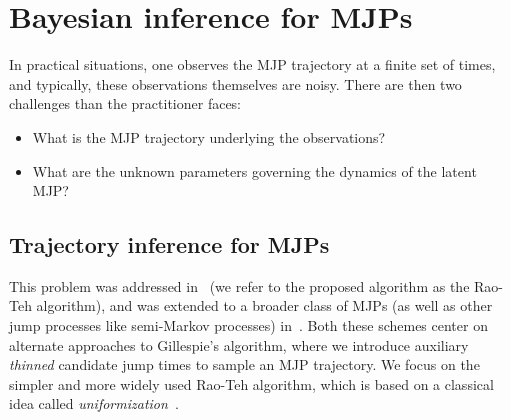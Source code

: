 
\section{Bayesian inference for MJPs}
In practical situations, one observes the MJP trajectory at
a finite set of times, and typically, these observations themselves
are noisy. There are then two challenges than the practitioner faces:
\begin{itemize}
  \item What is the MJP trajectory underlying the observations?
  \item What are the unknown parameters governing the dynamics of the 
    latent MJP?
\end{itemize}

\subsection{Trajectory inference for MJPs}
This problem was addressed in~\cite{RaoTeh13} (we refer to the proposed
algorithm as the Rao-Teh algorithm), and was extended to a broader class of 
MJPs (as well as other jump processes like semi-Markov processes) 
in~\cite{RaoTeh12}. Both these schemes center on alternate approaches to 
Gillespie's algorithm, where we introduce auxiliary {\em thinned} 
candidate jump times to sample an MJP trajectory. 
We focus on the simpler and more widely used Rao-Teh algorithm,
which is based on a classical idea called {\em uniformization}~\cite{Jen1953}. 

